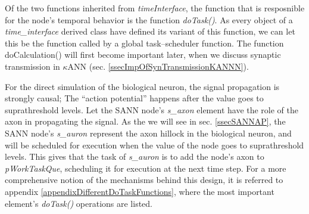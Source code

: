 	Of the two functions inherited from \emph{timeInterface}, %
		the function that is resposnible for the node's temporal behavior is the function \emph{doTask()}.
	As every object of a \emph{time\_interface} derived class have defined its variant of this function, we can let this be the function called by a global task--scheduler function. %
	The function doCalculation() will first become important later, when we discuss synaptic transmission in $\kappa$ANN (sec. \ref{ssecImpOfSynTransmissionKANNN}). 
	 



	For the direct simulation of the biological neuron, the signal propagation is strongly causal; The ``action potential'' happens after the value goes to suprathreshold levels.
	Let the SANN node's \emph{s\_axon} element have the role of the axon in propagating the signal.
	As the we will see in sec. \ref{ssecSANNAP}, the SANN node's \emph{s\_auron} represent the axon hillock in the biological neuron, and will be scheduled for execution when the value of the node goes to suprathreshold levels.
	This gives that the task of \emph{s\_auron} is to add the node's axon to \emph{pWorkTaskQue}, scheduling it for execution at the next time step.
	For a more comprehensive notion of the mechanisms behind this design, it is referred to appendix \ref{appendixDifferentDoTaskFunctions}, where the most important element's \emph{doTask()} operations are listed.

